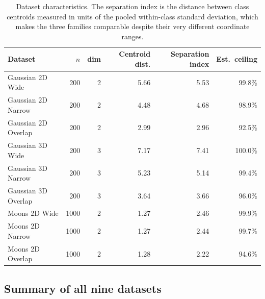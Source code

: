 \documentclass[11pt]{article}
\begin{document}
\begin{table}[H]
\centering
\small
\begin{tabular}{lrrrrr}
\toprule
Dataset & $n$ & dim & Centroid dist. & Separation index & Est.\ ceiling \\
\midrule
Gaussian 2D Wide     &  200 & 2 & 5.66 & 5.53 & 99.8\% \\
Gaussian 2D Narrow   &  200 & 2 & 4.48 & 4.68 & 98.9\% \\
Gaussian 2D Overlap  &  200 & 2 & 2.99 & 2.96 & 92.5\% \\
Gaussian 3D Wide     &  200 & 3 & 7.17 & 7.41 & 100.0\% \\
Gaussian 3D Narrow   &  200 & 3 & 5.23 & 5.14 & 99.4\% \\
Gaussian 3D Overlap  &  200 & 3 & 3.64 & 3.66 & 96.0\% \\
Moons 2D Wide        & 1000 & 2 & 1.27 & 2.46 & 99.9\% \\
Moons 2D Narrow      & 1000 & 2 & 1.27 & 2.44 & 99.7\% \\
Moons 2D Overlap     & 1000 & 2 & 1.28 & 2.22 & 94.6\% \\
\bottomrule
\end{tabular}
\caption{Dataset characteristics. The separation index is the distance between
class centroids measured in units of the pooled within-class standard
deviation, which makes the three families comparable despite their very
different coordinate ranges.}
\label{tab:chars}
\end{table}

\subsection{Summary of all nine datasets}
\end{document}
